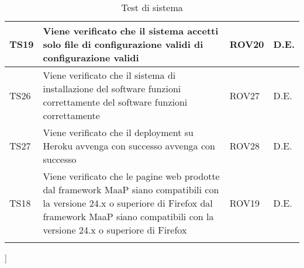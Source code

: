 \begin{center}
\begin{longtable}{|p{2cm}|p{7cm}|p{2cm}|p{2cm}|}
\midrule
TS19
& Viene verificato che il sistema accetti solo file di configurazione validi
di configurazione validi
& ROV20
& D.E.\\


\midrule
TS26
& Viene verificato che il sistema di installazione del software funzioni correttamente
del software funzioni correttamente
& ROV27
& D.E.\\


\midrule
TS27
& Viene verificato che il deployment su Heroku avvenga con successo
avvenga con successo
& ROV28
& D.E.\\


\midrule
TS18
& Viene verificato che le pagine web prodotte dal framework MaaP siano compatibili con la versione 24.x o superiore di Firefox
dal framework MaaP siano compatibili con la
versione 24.x o superiore di Firefox
& ROV19
& D.E.\\


\bottomrule
\caption{Test di sistema}
\end{longtable}
\end{center}
]

